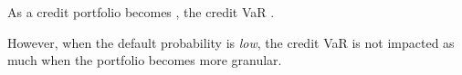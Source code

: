 
\begin{crkeybox}[Granularity]
As a credit portfolio becomes , the credit VaR
.

\smallskip
However, when the default probability is \emph{low}, the credit VaR is not
impacted as much when the portfolio becomes more granular.
\end{crkeybox}
